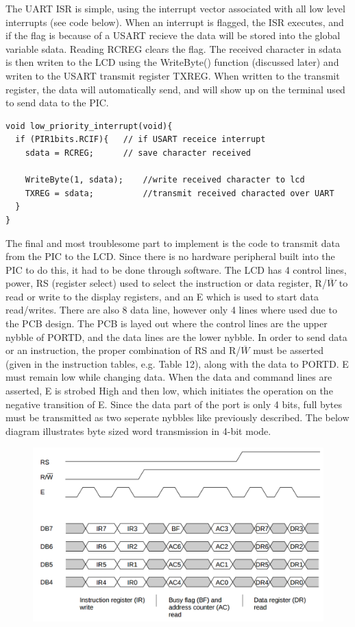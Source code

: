 \documentclass[12pt]{article}
\begin{document}
The UART ISR is simple, using the interrupt vector associated with all low level interrupts (see code below). When an interrupt is flagged, the ISR executes, and if the flag is because of a USART recieve the data will be stored into the global variable sdata. Reading RCREG clears the flag. The received character in sdata is then writen to the LCD using the WriteByte() function (discussed later) and writen to the USART transmit register TXREG. When written to the transmit register, the data will automatically send, and will show up on the terminal used to send data to the PIC.
\begin{lstlisting}
void low_priority_interrupt(void){
  if (PIR1bits.RCIF){   // if USART receice interrupt
	sdata = RCREG;      // save character received 

	WriteByte(1, sdata);	//write received character to lcd
	TXREG = sdata;			//transmit received characted over UART
  } 
}
\end{lstlisting}
The final and most troublesome part to implement is the code to transmit data from the PIC to the LCD. Since there is no hardware peripheral built into the PIC to do this, it had to be done through software. The LCD has 4 control lines, power, RS (register select) used to select the instruction or data register, R/$\overline{W}$ to read or write to the display registers, and an E which is used to start data read/writes. There are also 8 data line, however only 4 lines where used due to the PCB design. The PCB is layed out where the control lines are the upper nybble of PORTD, and the data lines are the lower nybble. In order to send data or an instruction, the proper combination of RS and R/$\overline{W}$ must be asserted (given in the instruction tables, e.g. Table 12), along with the data to PORTD. E must remain low while changing data. When the data and command lines are asserted, E is strobed High and then low, which initiates the operation on the negative transition of E. Since the data part of the port is only 4 bits, full bytes must be transmitted as two seperate nybbles like previously described. The below diagram illustrates byte sized word transmission in 4-bit mode.
\FloatBarrier
\begin{figure}[h!]
\begin{center}
 \includegraphics[scale=0.25]{./time.png}
\end{center}
\end{figure}
\end{document}
